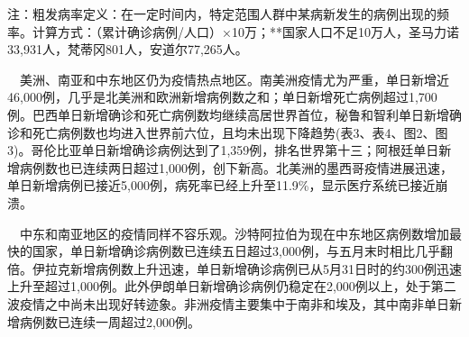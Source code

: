 \documentclass[
]{article}
\begin{document}
\begin{table}[H]
    \begin{tablenotes}
        \fontsize{12}{12}
        \selectfont
        \item 注：粗发病率定义：在一定时间内，特定范围人群中某病新发生的病例出现的频率。计算方式：（累计确诊病例/人口）×10万；**国家人口不足10万人，圣马力诺33,931人，梵蒂冈801人，安道尔77,265人。  %
      \end{tablenotes}
\end{table}

\newpage

\(\quad\)美洲、南亚和中东地区仍为疫情热点地区。南美洲疫情尤为严重，单日新增近46,000例，几乎是北美洲和欧洲新增病例数之和；单日新增死亡病例超过1,700例。巴西单日新增确诊和死亡病例数均继续高居世界首位，秘鲁和智利单日新增确诊和死亡病例数也均进入世界前六位，且均未出现下降趋势(表3、表4、图2、图3)。哥伦比亚单日新增确诊病例达到了1,359例，排名世界第十三；阿根廷单日新增病例数也已连续两日超过1,000例，创下新高。北美洲的墨西哥疫情进展迅速，单日新增病例已接近5,000例，病死率已经上升至11.9\%，显示医疗系统已接近崩溃。

\(\quad\)中东和南亚地区的疫情同样不容乐观。沙特阿拉伯为现在中东地区病例数增加最快的国家，单日新增确诊病例数已连续五日超过3,000例，与五月末时相比几乎翻倍。伊拉克新增病例数上升迅速，单日新增确诊病例已从5月31日时的约300例迅速上升至超过1,000例。此外伊朗单日新增确诊病例仍稳定在2,000例以上，处于第二波疫情之中尚未出现好转迹象。非洲疫情主要集中于南非和埃及，其中南非单日新增病例数已连续一周超过2,000例。
\end{document}
